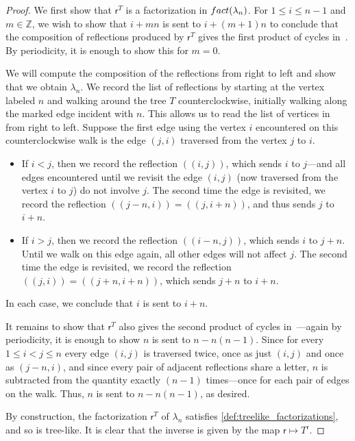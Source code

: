 \documentclass[a4paper,10pt,leqno]{amsart}
\numberwithin{equation}{section}
\theoremstyle{definition}
\theoremstyle{remark}
\newcommand{\Fact}{\textsc{fact}}
\newcommand{\rrT}{\rr^T}
\newcommand{\rr}{\mathsf{r}}
\newcommand{\Trr}{T^\rr}
\begin{document}
\begin{proof}
We first show that $\rrT$ is a factorization in $\Fact(\lambda_n)$. For $1 \leq i \leq n-1$ and $m \in \mathbb{Z}$, we wish to show that $i+mn$ is sent to $i+(m+1)n$ to conclude that the composition of reflections produced by $\rrT$ gives the first product of cycles in~.  By periodicity, it is enough to show this for $m=0$.

We will compute the composition of the reflections from right to left and show that we obtain $\lambda_n$.  We record the list of reflections by starting at the vertex labeled $n$ and walking around the tree $T$ counterclockwise, initially walking along the marked edge incident with $n$.  This allows us to read the list of vertices in~ from right to left.  Suppose the first edge using the vertex $i$ encountered on this counterclockwise walk is the edge $(j,i)$ traversed from the vertex $j$ to $i$.

\begin{itemize}
\item If $i<j$, then we record the reflection $(\!(i,j)\!)$, which sends $i$ to $j$---and all edges encountered until we revisit the edge $(i,j)$ (now traversed from the vertex $i$ to $j$) do not involve $j$.  The second time the edge is revisited, we record the reflection $(\!(j-n,i)\!)=(\!(j,i+n)\!)$, and thus sends $j$ to $i+n$.
\item If $i>j$, then we record the reflection $(\!(i-n,j)\!)$, which sends $i$ to $j+n$.  Until we walk on this edge again, all other edges will not affect $j$. The second time the edge is revisited, we record the reflection $(\!(j,i)\!)=(\!(j+n,i+n)\!)$, which sends $j+n$ to $i+n$.
\end{itemize}
In each case, we conclude that $i$ is sent to $i+n$.

It remains to show that $\rrT$ also gives the second product of cycles in~---again by periodicity, it is enough to show $n$ is sent to $n-n(n-1)$.  Since for every $1 \leq i<j \leq n$ every edge $(i,j)$ is traversed twice, once as just $(i,j)$ and once as $(j-n,i)$, and since every pair of adjacent reflections share a letter, $n$ is subtracted from the quantity exactly $(n-1)$ times---once for each pair of edges on the walk.  Thus, $n$ is sent to $n-n(n-1)$, as desired. 

By construction, the factorization $\rrT$ of $\lambda_n$ satisfies \cref{def:treelike_factorizations}, and so is tree-like.  It is clear that the inverse is given by the map $\rr \mapsto \Trr$.
\end{proof}
\end{document}
